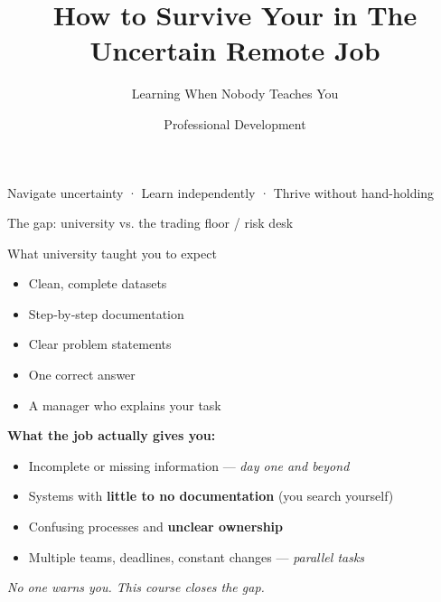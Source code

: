 \documentclass[aspectratio=169, 11pt]{beamer}
\title{\textbf{How to Survive Your in The Uncertain Remote Job}}
\subtitle{Learning When Nobody Teaches You}
\author{Professional Development}
\date{}
\begin{document}
	
	\begin{frame}
		\titlepage
		\centering
		\vspace{0.5cm}
		\small{Navigate uncertainty · Learn independently · Thrive without hand-holding}
	\end{frame}
	
	
	
	\begin{frame}{The gap: university vs. the trading floor / risk desk}
		\begin{block}{What university taught you to expect}
			\begin{itemize}
				\item Clean, complete datasets
				\item Step‑by‑step documentation
				\item Clear problem statements
				\item One correct answer
				\item A manager who explains your task
			\end{itemize}
		\end{block}
		\vspace{0.2cm}
		\alert{\textbf{What the job actually gives you:}}
		\begin{itemize}
			\item Incomplete or missing information — \textit{day one and beyond}
			\item Systems with \textbf{little to no documentation} (you search yourself)
			\item Confusing processes and \textbf{unclear ownership}
			\item Multiple teams, deadlines, constant changes — \textit{parallel tasks}
		\end{itemize}
		\vspace{0.1cm}
		\textit{No one warns you. This course closes the gap.}
	\end{frame}
	
\end{document}
